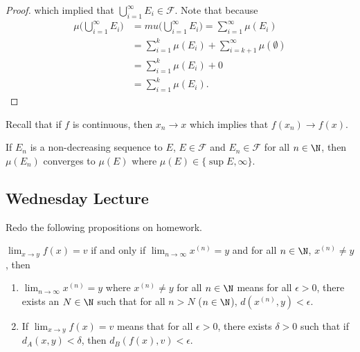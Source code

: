 \begin{proof}
which implied that \( \bigcup_{ i=1  }^{ \infty  }  {E}_{i} \in \mathcal{F} \). Note that 
because 
\begin{align*}
    \mu \Big(  \bigcup_{ i=1  }^{ \infty  }  {E}_{i}  \Big) &= mu \Big(  \bigcup_{ i =1  }^{ \infty  }  {E}_{i} \Big) = \sum_{ i=1  }^{ \infty  } \mu({E}_{i}) \\
                                                            &= \sum_{ i=1  }^{ k  } \mu({E}_{i}) + \sum_{ i = k + 1  }^{ \infty  } \mu(\emptyset) \\
                                                            &= \sum_{ i=1  }^{ k  } \mu({E}_{i}) + 0  \\
                                                            &= \sum_{ i=1  }^{ k  } \mu({E}_{i}).
\end{align*}
\end{proof}

Recall that if \( f  \) is continuous, then \( {x}_{n} \to x  \) which implies that \( f({x}_{n}) \to f(x) \).

\begin{prop}
    If \( {E}_{n}  \) is a non-decreasing sequence to \( E  \), \( E \in \mathcal{F} \) and \( {E}_{n} \in \mathcal{F} \) for all \( n \in \N \), then \( \mu({E}_{n})  \) converges to \( \mu(E) \) where \( \mu(E) \in \{ \sup E  , \infty   \}  \). 
\end{prop}

\subsection{Wednesday Lecture}

Redo the following propositions on homework.

\begin{prop}
   \( \lim_{ x \to y }  f(x) = v  \) if and only if \( \lim_{ n \to \infty  }  x^{(n)}  = y \) and for all \( n \in \N  \), \( x^{(n)} \neq y  \), then  
   \begin{enumerate}
       \item[(*)] \( \lim_{ n \to \infty  }  x^{(n)}  = y  \) where \( x^{(n)} \neq y  \) for all \( n \in \N  \) means for all \( \epsilon > 0  \), there exists an \( N \in \N  \) such that for all \( n > N  \) (\( n \in \N  \)), \( d(x^{(n)}, y) < \epsilon \).
        \item[(*)] If \( \lim_{ x \to y }  f(x) = v  \) means that for all \( \epsilon > 0  \), there exists \( \delta > 0  \) such that if \( {d}_{A}(x,y) < \delta \), then \( {d}_{B}(f(x), v) < \epsilon \).
   \end{enumerate}
\end{prop}

